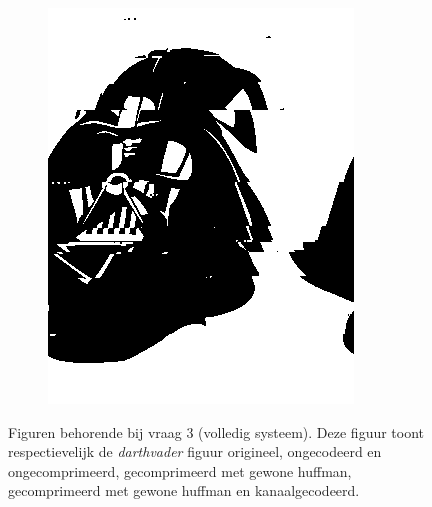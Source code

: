 \documentclass[]{article}
\begin{document}
\begin{section}
\begin{figure}
\begin{subfigure}{0.4\textwidth}
                \includegraphics[width=\textwidth]{vraag3_3/coded_compressed.png}
                \caption{}
                \label{fig:3_3:coded_compressed}
            \end{subfigure}

            \caption{Figuren behorende bij vraag 3 (volledig systeem). Deze figuur
            toont respectievelijk de \emph{darthvader} figuur origineel, ongecodeerd en 
            ongecomprimeerd, gecomprimeerd met gewone huffman, gecomprimeerd met gewone
            huffman en kanaalgecodeerd.}

            \label{fig:3_3}

        \end{figure}
\end{section}
\clearpage
\end{document}
